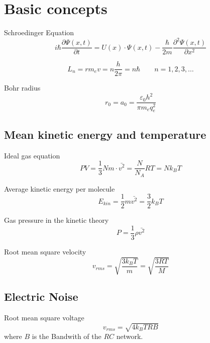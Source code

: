 \section{Basic concepts}

Schroedinger Equation
\begin{equation}
	i \hbar \frac{\partial\Psi(x,t)}{\partial t} = U(x) \cdot \Psi(x,t) - \frac{\hbar}{2m} \frac{\partial^2 \Psi(x,t)}{\partial x^2}
\end{equation}

\begin{equation}
	L_n = r m_e v = n \frac{h}{2\pi} = n \hbar \qquad n = 1,2,3,\dots
\end{equation}


Bohr radius
\begin{equation}
	r_0 = a_0 = \frac{\varepsilon_0 h^2}{\pi m_e q_e^2}
\end{equation}

\subsection{Mean kinetic energy and temperature}
Ideal gas equation
\begin{equation}
	PV = \frac{1}{3} Nm \cdot \bar{v^2} = \frac{N}{N_A}RT = N k_B T
\end{equation}

Average kinetic energy per molecule
\begin{equation}
	E_{kin} = \frac{1}{2} m \bar{v^2} = \frac{3}{2} k_B T
\end{equation}

Gas pressure in the kinetic theory
\begin{equation}
	P = \frac{1}{3} \rho \bar{v^2}
\end{equation}

Root mean square velocity
\begin{equation}
	v_{rms} = \sqrt{\frac{3 k_B T}{m}} = \sqrt{\frac{3RT}{M}}
\end{equation}

\subsection{Electric Noise}
Root mean square voltage
\begin{equation}
	v_{rms}  = \sqrt{4 k_B T R B}
\end{equation}
where $B$ is the Bandwith of the $RC$ network.

